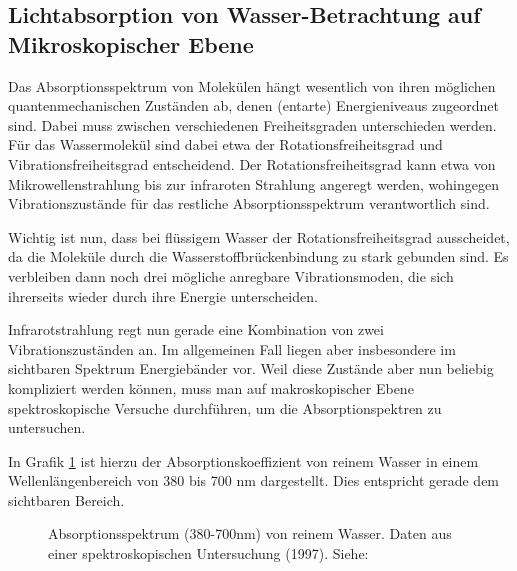 \documentclass[12pt,a4paper,titlepage,headinclude,bibtotoc]{scrartcl}
\numberwithin{equation}{subsection}
\begin{document}
\subsection{Lichtabsorption von Wasser-Betrachtung auf Mikroskopischer Ebene}
Das Absorptionsspektrum von Molekülen hängt wesentlich von ihren möglichen 
quantenmechanischen Zuständen ab, denen (entarte) Energieniveaus zugeordnet sind. Dabei muss zwischen verschiedenen Freiheitsgraden
unterschieden werden. Für das Wassermolekül sind dabei etwa der Rotationsfreiheitsgrad und Vibrationsfreiheitsgrad entscheidend.
Der Rotationsfreiheitsgrad kann etwa von Mikrowellenstrahlung bis zur infraroten Strahlung angeregt werden, wohingegen Vibrationszustände für das restliche Absorptionsspektrum verantwortlich sind.


Wichtig ist nun, dass bei flüssigem Wasser der Rotationsfreiheitsgrad ausscheidet, da die Moleküle durch die Wasserstoffbrückenbindung zu stark gebunden sind.
Es verbleiben dann noch drei mögliche anregbare Vibrationsmoden, die sich ihrerseits wieder durch ihre Energie unterscheiden.

Infrarotstrahlung regt nun gerade eine Kombination von zwei Vibrationszuständen an.
Im allgemeinen Fall liegen aber insbesondere im sichtbaren Spektrum Energiebänder vor.
Weil diese Zustände aber nun beliebig kompliziert werden können, muss man auf makroskopischer Ebene spektroskopische Versuche durchführen, um die Absorptionspektren zu untersuchen.

In Grafik \ref{fig:abs} ist hierzu der Absorptionskoeffizient von reinem Wasser in einem Wellenlängenbereich von 380 bis 700 nm dargestellt.
Dies entspricht gerade dem sichtbaren Bereich.

\cite{abs}

\begin{figure}[h]
	\centering
	
	\caption{Absorptionsspektrum (380-700nm) von reinem Wasser. Daten aus einer spektroskopischen Untersuchung (1997). Siehe: \cite{speck}}
	\label{fig:abs}
\end{figure}
\end{document}
